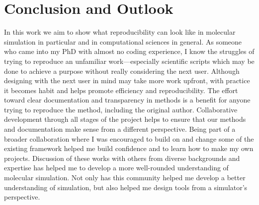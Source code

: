 \chapter{Conclusion and Outlook}
\label{chap:conclusion}

In this work we aim to show what reproducibility can look like in molecular simulation in particular and in computational sciences in general.
As someone who came into my PhD with almost no coding experience, I know the struggles of trying to reproduce an unfamiliar work---especially scientific scripts which may be done to achieve a purpose without really considering the next user. 
Although designing with the next user in mind may take more work upfront, with practice it becomes habit and helps promote efficiency and reproducibility. 
The effort toward clear documentation and transparency in methods is a benefit for anyone trying to reproduce the method, including the original author.
Collaborative development through all stages of the project helps to ensure that our methods and documentation make sense from a different perspective.
Being part of a broader collaboration where I was encouraged to build on and change some of the existing framework helped me build confidence and to learn how to make my own projects.
Discussion of these works with others from diverse backgrounds and expertise has helped me to develop a more well-rounded understanding of molecular simulation.
Not only has this community helped me develop a better understanding of simulation, but also helped me design tools from a simulator's perspective.

